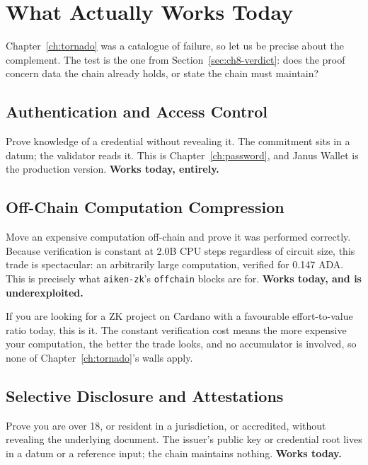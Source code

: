 \section{What Actually Works Today} \label{sec:ch9-works}

Chapter~\ref{ch:tornado} was a catalogue of failure, so let us be precise about
the complement. The test is the one from Section~\ref{sec:ch8-verdict}: does the
proof concern data the chain already holds, or state the chain must maintain?

\subsection*{Authentication and Access Control}

Prove knowledge of a credential without revealing it. The commitment sits in a
datum; the validator reads it. This is Chapter~\ref{ch:password}, and Janus
Wallet is the production version. \textbf{Works today, entirely.}

\subsection*{Off-Chain Computation Compression}

Move an expensive computation off-chain and prove it was performed correctly.
Because verification is constant at 2.0B CPU steps regardless of circuit size,
this trade is spectacular: an arbitrarily large computation, verified for 0.147
ADA. This is precisely what \texttt{aiken-zk}'s \texttt{offchain} blocks are
for. \textbf{Works today, and is underexploited.}

\begin{highlight}
If you are looking for a ZK project on Cardano with a favourable
effort-to-value ratio today, this is it. The constant verification cost means
the more expensive your computation, the better the trade looks, and no
accumulator is involved, so none of Chapter~\ref{ch:tornado}'s walls apply.
\end{highlight}

\subsection*{Selective Disclosure and Attestations}

Prove you are over 18, or resident in a jurisdiction, or accredited, without
revealing the underlying document. The issuer's public key or credential root
lives in a datum or a reference input; the chain maintains nothing. \textbf{Works
today.}

